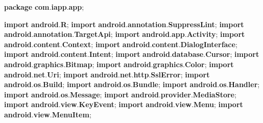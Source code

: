 \documentclass[
]{article}
\newenvironment{Shaded}{}{}
\newcommand{\ImportTok}[1]{\textcolor[rgb]{0.00,0.50,0.00}{\textbf{#1}}}
\newcommand{\KeywordTok}[1]{\textcolor[rgb]{0.00,0.44,0.13}{\textbf{#1}}}
\newcommand{\OperatorTok}[1]{\textcolor[rgb]{0.40,0.40,0.40}{#1}}
\begin{document}
\begin{Shaded}
\begin{Highlighting}[]
\KeywordTok{package}\ImportTok{ com}\OperatorTok{.}\ImportTok{iapp}\OperatorTok{.}\ImportTok{app}\OperatorTok{;}

\KeywordTok{import} \ImportTok{android}\OperatorTok{.}\ImportTok{R}\OperatorTok{;}
\KeywordTok{import} \ImportTok{android}\OperatorTok{.}\ImportTok{annotation}\OperatorTok{.}\ImportTok{SuppressLint}\OperatorTok{;}
\KeywordTok{import} \ImportTok{android}\OperatorTok{.}\ImportTok{annotation}\OperatorTok{.}\ImportTok{TargetApi}\OperatorTok{;}
\KeywordTok{import} \ImportTok{android}\OperatorTok{.}\ImportTok{app}\OperatorTok{.}\ImportTok{Activity}\OperatorTok{;}
\KeywordTok{import} \ImportTok{android}\OperatorTok{.}\ImportTok{content}\OperatorTok{.}\ImportTok{Context}\OperatorTok{;}
\KeywordTok{import} \ImportTok{android}\OperatorTok{.}\ImportTok{content}\OperatorTok{.}\ImportTok{DialogInterface}\OperatorTok{;}
\KeywordTok{import} \ImportTok{android}\OperatorTok{.}\ImportTok{content}\OperatorTok{.}\ImportTok{Intent}\OperatorTok{;}
\KeywordTok{import} \ImportTok{android}\OperatorTok{.}\ImportTok{database}\OperatorTok{.}\ImportTok{Cursor}\OperatorTok{;}
\KeywordTok{import} \ImportTok{android}\OperatorTok{.}\ImportTok{graphics}\OperatorTok{.}\ImportTok{Bitmap}\OperatorTok{;}
\KeywordTok{import} \ImportTok{android}\OperatorTok{.}\ImportTok{graphics}\OperatorTok{.}\ImportTok{Color}\OperatorTok{;}
\KeywordTok{import} \ImportTok{android}\OperatorTok{.}\ImportTok{net}\OperatorTok{.}\ImportTok{Uri}\OperatorTok{;}
\KeywordTok{import} \ImportTok{android}\OperatorTok{.}\ImportTok{net}\OperatorTok{.}\ImportTok{http}\OperatorTok{.}\ImportTok{SslError}\OperatorTok{;}
\KeywordTok{import} \ImportTok{android}\OperatorTok{.}\ImportTok{os}\OperatorTok{.}\ImportTok{Build}\OperatorTok{;}
\KeywordTok{import} \ImportTok{android}\OperatorTok{.}\ImportTok{os}\OperatorTok{.}\ImportTok{Bundle}\OperatorTok{;}
\KeywordTok{import} \ImportTok{android}\OperatorTok{.}\ImportTok{os}\OperatorTok{.}\ImportTok{Handler}\OperatorTok{;}
\KeywordTok{import} \ImportTok{android}\OperatorTok{.}\ImportTok{os}\OperatorTok{.}\ImportTok{Message}\OperatorTok{;}
\KeywordTok{import} \ImportTok{android}\OperatorTok{.}\ImportTok{provider}\OperatorTok{.}\ImportTok{MediaStore}\OperatorTok{;}
\KeywordTok{import} \ImportTok{android}\OperatorTok{.}\ImportTok{view}\OperatorTok{.}\ImportTok{KeyEvent}\OperatorTok{;}
\KeywordTok{import} \ImportTok{android}\OperatorTok{.}\ImportTok{view}\OperatorTok{.}\ImportTok{Menu}\OperatorTok{;}
\KeywordTok{import} \ImportTok{android}\OperatorTok{.}\ImportTok{view}\OperatorTok{.}\ImportTok{MenuItem}\OperatorTok{;}

\end{Highlighting}
\end{Shaded}
\end{document}
